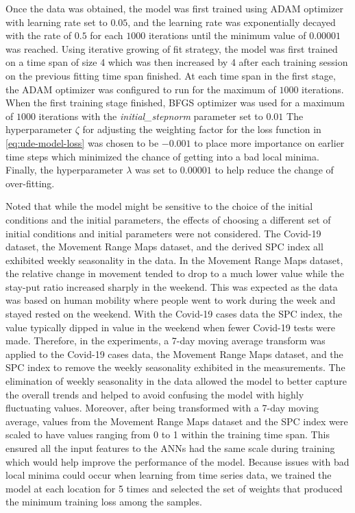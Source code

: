 Once the data was obtained, the model was first trained using ADAM optimizer with learning rate set to $0.05$, and the learning rate was exponentially decayed with the rate of $0.5$ for each $1000$ iterations until the minimum value of $0.00001$ was reached.
Using iterative growing of fit strategy, the model was first trained on a time span of size 4 which was then increased by 4 after each training session on the previous fitting time span finished.
At each time span in the first stage, the ADAM optimizer was configured to run for the maximum of $1000$ iterations.
When the first training stage finished, BFGS optimizer was used for a maximum of $1000$ iterations with the \textit{initial\_stepnorm} parameter set to $0.01$
The hyperparameter $\zeta$ for adjusting the weighting factor for the loss function in \autoref{eq:ude-model-loss} was chosen to be $-0.001$ to place more importance on earlier time steps which minimized the chance of getting into a bad local minima.
Finally, the hyperparameter $\lambda$ was set to $0.00001$ to help reduce the change of over-fitting.

Noted that while the model might be sensitive to the choice of the initial conditions and the initial parameters, the effects of choosing a different set of initial conditions and initial parameters were not considered.
The Covid-19 dataset, the Movement Range Maps dataset, and the derived \gls{SPC} index all exhibited weekly seasonality in the data.
In the Movement Range Maps dataset, the relative change in movement tended to drop to a much lower value while the stay-put ratio increased sharply in the weekend.
This was expected as the data was based on human mobility where people went to work during the week and stayed rested on the weekend.
With the Covid-19 cases data the \gls{SPC} index, the value typically dipped in value in the weekend when fewer Covid-19 tests were made.
Therefore, in the experiments, a 7-day moving average transform was applied to the Covid-19 cases data, the Movement Range Maps dataset, and the \gls{SPC} index to remove the weekly seasonality exhibited in the measurements.
The elimination of weekly seasonality in the data allowed the model to better capture the overall trends and helped to avoid confusing the model with highly fluctuating values.
Moreover, after being transformed with a 7-day moving average, values from the Movement Range Maps dataset and the \gls{SPC} index were scaled to have values ranging from 0 to 1 within the training time span.
This ensured all the input features to the \glspl{ANN} had the same scale during training which would help improve the performance of the model.
Because issues with bad local minima could occur when learning from time series data, we trained the model at each location for 5 times and selected the set of weights that produced the minimum training loss among the samples.